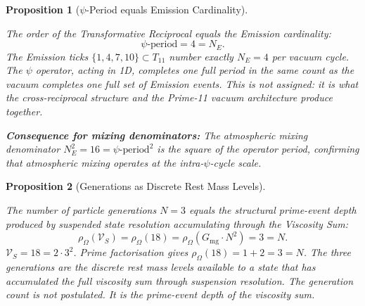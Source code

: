 \documentclass[11pt, letterpaper]{article}
\newcommand{\Tcyc}{T_{11}}
\newcommand{\VS}{\mathcal{V}_S}
\theoremstyle{definition}
\theoremstyle{plain}
\newtheorem{proposition}{Proposition}[section]
\begin{document}
\begin{proposition}[$\psi$-Period equals Emission Cardinality]\label{prop:psi-ne}
\begin{rsbox}
The order of the Transformative Reciprocal equals the Emission cardinality:
\[
\psi\text{-period} = 4 = N_E.
\]
The Emission ticks $\{1, 4, 7, 10\} \subset \Tcyc$ number exactly $N_E = 4$
per vacuum cycle.  The $\psi$ operator, acting in 1D, completes one full
period in the same count as the vacuum completes one full set of Emission
events.  This is not assigned: it is what the cross-reciprocal structure
and the Prime-11 vacuum architecture produce together.

\medskip
\noindent\textbf{Consequence for mixing denominators:}
The atmospheric mixing denominator $N_E^2 = 16 = \psi\text{-period}^2$
is the square of the operator period, confirming that atmospheric mixing
operates at the intra-$\psi$-cycle scale.
\end{rsbox}
\end{proposition}

\begin{proposition}[Generations as Discrete Rest Mass Levels]\label{prop:generations-mass}
\begin{rsbox}
The number of particle generations $N = 3$ equals the structural prime-event depth produced by suspended state resolution accumulating through the Viscosity Sum:
\[
\rho_\Omega(\VS) = \rho_\Omega(18) = \rho_\Omega(G_{\mathrm{mg}} \cdot N^2) = 3 = N.
\]
$\VS = 18 = 2 \cdot 3^2$. Prime factorisation gives $\rho_\Omega(18) = 1 + 2 = 3 = N$. The three generations are the discrete rest mass levels available to a state that has accumulated the full viscosity sum through suspension resolution. The generation count is not postulated. It is the prime-event depth of the viscosity sum.
\end{rsbox}
\end{proposition}
\end{document}
